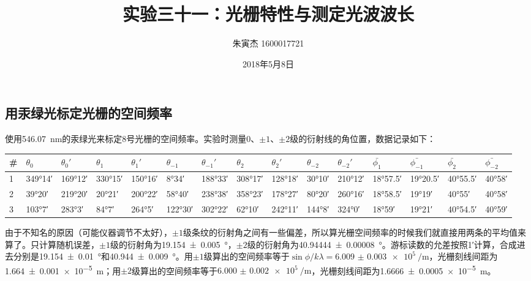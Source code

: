 \documentclass[9pt,UTF8]{ctexart}
\title{实验三十一：光栅特性与测定光波波长}
\author{朱寅杰 1600017721}
\date{2018年5月8日}
\begin{document}
\maketitle
\setcounter{section}{31}

\subsection{用汞绿光标定光栅的空间频率}

使用\SI{546.07}{\nm}的汞绿光来标定8号光栅的空间频率。实验时测量0、$\pm1$、$\pm2$级的衍射线的角位置，数据记录如下：
\begin{center}
\noindent
\begin{tabu} to \linewidth {X[c,-1]|X[c,-10] X[c,-10]|X[c,-10] X[c,-10]|X[c,-10] X[c,-10]|X[c,-10] X[c,-10]|X[c,-10] X[c,-10]||X[c,-10] X[c,-10]|X[c,-10] X[c,-10]}

\hline
\#	&$\theta_0$	&$\theta_0'$	&$\theta_1$	&$\theta_1'$	&$\theta_{-1}$&$\theta_{-1}'$	&$\theta_2$	&$\theta_2'$	&$\theta_{-2}$	&$\theta_{-2}'$	&$\bar{\phi_1}$&$\bar{\phi_{-1}}$	&$\bar{\phi_2}$&$\bar{\phi_{-2}}$
\\
	&\ang{349;14;}	&\ang{169;12;}	&\ang{330;15;}	&\ang{150;16;}	&\ang{8;34;}	&\ang{188;33;}	&\ang{308;17;}	&\ang{128;18;}	&\ang{30;10;}	&\ang{210;12;}	&\ang{18;57.5;}	&\ang{19;20.5;}	&\ang{40;55.5;}	&\ang{40;58;}	
\\
2	&\ang{39;20;}	&\ang{219;20;}	&\ang{20;21;}	&\ang{200;22;}	&\ang{58;40;}	&\ang{238;38;}	&\ang{358;23;}	&\ang{178;27;}	&\ang{80;20;}	&\ang{260;16;}	&\ang{18;58.5;}	&\ang{19;19;}	&\ang{40;55;}	&\ang{40;58;}
\\
3	&\ang{103;7;}	&\ang{283;3;}	&\ang{84;7;}	&\ang{264;5;}	&\ang{122;30;}	&\ang{302;22;}	&\ang{62;10;}	&\ang{242;11;}	&\ang{144;8;}	&\ang{324;0;}	&\ang{18;59;}	&\ang{19;21;}	&\ang{40;54.5;}	&\ang{40;59;}
\\
\hline
\end{tabu}
\end{center}
由于不知名的原因（可能仪器调节不太好），$\pm1$级条纹的衍射角之间有一些偏差，所以算光栅空间频率的时候我们就直接用两条的平均值来算了。只计算随机误差，$\pm1$级的衍射角为\SI{19.154(5)}{\degree}，$\pm2$级的衍射角为\SI{40.94444(8)}{\degree}。游标读数的允差按照\ang{;1;}计算，合成进去分别是\SI{19.154(10)}{\degree}和\SI{40.944(9)}{\degree}。用$\pm1$级算出的空间频率等于$\sin\phi/k\lambda=\SI{6.009(3)e5}{\per\meter}$，光栅刻线间距为\SI{1.664(1)e-5}{\meter}；用$\pm2$级算出的空间频率等于$\SI{6.000(2)e5} {\per\meter}$，光栅刻线间距为\SI{1.6666(5)e-5}{\meter}。
\end{document}
